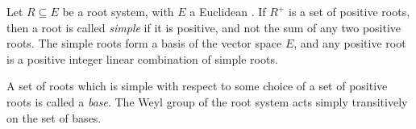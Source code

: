 \documentclass[12pt]{article}
\begin{document}

Let $R\subseteq E$ be a root system, with $E$ a Euclidean .  If $R^+$ is a set of
positive roots, then a root is called {\em simple} if it is positive, and not the sum of any two
positive roots.  The simple roots form a basis of the vector space $E$, and any positive root
is a positive integer linear combination of simple roots.

A set of roots which is simple with respect to some choice of a set of positive roots is called a 
{\em base}.  The Weyl group of the root system acts simply transitively on the set of bases.
\end{document}
